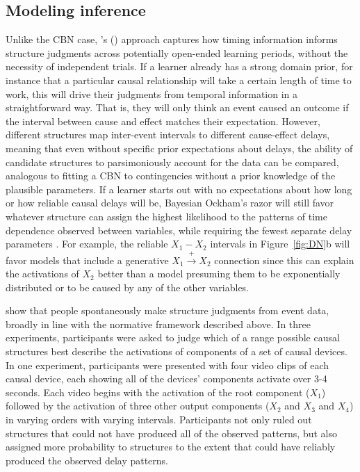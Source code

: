\documentclass{cambridge7A}%
\newcommand{\ttodo}[2][]{\vspace{0.1cm} \hfil \todo[caption={\textbf{TG}}, size=\footnotesize, color = orange, inline, #1]{#2}}
\def\citeapos#1{\citeauthor{#1}'s (\citeyear{#1})}
\begin{document}
\subsection{Modeling inference}

Unlike the CBN case, \citeapos{bramley2018time} approach captures how timing information informs structure judgments across potentially open-ended learning periods, without the necessity of independent trials.  If a learner already has a strong domain prior, for instance that a particular causal relationship will take a certain length of time to work, this will drive their judgments from temporal information in a straightforward way.  That is, they will only think an event caused an outcome if the interval between cause and effect matches their expectation.  However, different structures map inter-event intervals to different cause-effect delays, meaning that even without specific prior expectations about delays, the ability of candidate structures to parsimoniously account for the data can be compared, analogous to fitting a CBN to contingencies without a prior knowledge of the plausible parameters.  If a learner starts out with no expectations about how long or how reliable causal delays will be, %
Bayesian Ockham's razor will still favor whatever structure can assign the highest likelihood to the patterns of time dependence observed between variables, while requiring the fewest separate delay parameters \citep{bramley2018time}.   For example, the reliable $X_1-X_2$ intervals %
in Figure~\ref{fig:DN}b will favor models that include a generative $X_1\!\stackrel{+}\rightarrow\!X_2$ connection since this can explain the activations of $X_2$ better than a model presuming them to be exponentially distributed or to be caused by any of the other variables.   %

\cite{bramley2018time} show that people spontaneously make structure judgments from event data, broadly in line with the normative framework described above.  In three experiments, participants were asked to judge which of a range possible causal structures best describe the activations of components of a set of causal devices.    In one experiment, participants were presented with four video clips of each causal device, each showing all of the devices' components activate over 3-4 seconds.  Each video begins with the activation of the root component ($X_1$) followed by the activation of three other output components ($X_2$ and $X_3$ and $X_4$) in varying orders with varying intervals.  Participants not only ruled out structures that could not have produced all of the observed patterns, but also assigned more probability to structures to the extent that could have reliably produced the observed delay patterns. %
\end{document}
